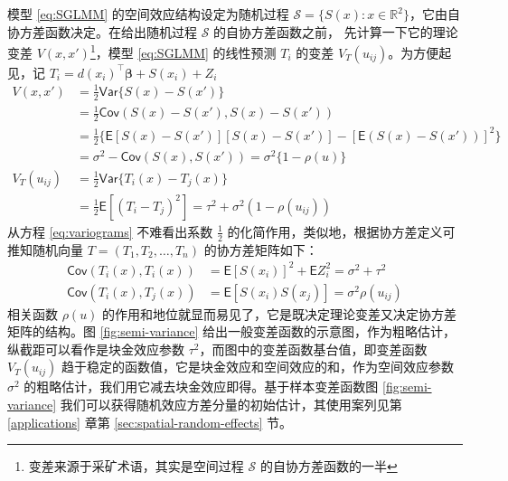 \documentclass[12pt,a4paper,UTF8,twoside]{book}
\theoremstyle{definition}
\theoremstyle{definition}
\theoremstyle{definition}
\theoremstyle{remark}
\begin{document}
模型 \eqref{eq:SGLMM} 的空间效应结构设定为随机过程
\(\mathcal{S} = \{S(x): x \in \mathbb{R}^2\}\)，它由自协方差函数决定。在给出随机过程
\(\mathcal{S}\) 的自协方差函数之前， 先计算一下它的理论变差
\(V(x,x')\)\footnote{变差来源于采矿术语，其实是空间过程 \(\mathcal{S}\)
  的自协方差函数的一半}，模型 \eqref{eq:SGLMM} 的线性预测 \(T_{i}\) 的变差
\(V_{T}(u_{ij})\)。为方便起见，记
\(T_{i} = d(x_i)^{\top}\boldsymbol{\beta} + S(x_i) + Z_i\)
\begin{equation}
\begin{aligned}
V(x,x') 
      &= \frac{1}{2}\mathsf{Var}\{S(x)-S(x')\}\\
      &= \frac{1}{2}\mathsf{Cov}(S(x)-S(x'),S(x)-S(x'))\\
      &= \frac{1}{2}\{\mathsf{E}[S(x)-S(x')][S(x)-S(x')]-[\mathsf{E}(S(x)-S(x'))]^2\}\\
      &= \sigma^2-\mathsf{Cov}(S(x),S(x'))=\sigma^2\{1-\rho(u)\}\\
V_{T}(u_{ij})
      &= \frac{1}{2}\mathsf{Var}\{T_{i}(x)-T_{j}(x)\} \\
      &= \frac{1}{2}\mathsf{E}[(T_{i}-T_{j})^2]=\tau^2+\sigma^2(1-\rho(u_{ij})) 
\end{aligned} \label{eq:variograms}
\end{equation} \noindent 从方程 \eqref{eq:variograms} 不难看出系数
\(\frac{1}{2}\) 的化简作用，类似地，根据协方差定义可推知随机向量
\(T = (T_1,T_2,\ldots,T_n)\) 的协方差矩阵如下： \begin{equation}
\begin{aligned}
\mathsf{Cov}(T_{i}(x),T_{i}(x)) &= \mathsf{E}[S(x_i)]^2 + \mathsf{E}Z_{i}^{2}= \sigma^2+\tau^2 \\
\mathsf{Cov}(T_{i}(x),T_{j}(x)) &= \mathsf{E}[S(x_i)S(x_j)]  = \sigma^2\rho(u_{ij})
\end{aligned}
\end{equation} \noindent 相关函数 \(\rho(u)\)
的作用和地位就显而易见了，它是既决定理论变差又决定协方差矩阵的结构。图
\ref{fig:semi-variance}
给出一般变差函数的示意图，作为粗略估计，纵截距可以看作是块金效应参数
\(\tau^2\)，而图中的变差函数基台值，即变差函数 \(V_{T}(u_{ij})\)
趋于稳定的函数值，它是块金效应和空间效应的和，作为空间效应参数
\(\sigma^2\) 的粗略估计，我们用它减去块金效应即得。基于样本变差函数图
\ref{fig:semi-variance}
我们可以获得随机效应方差分量的初始估计，其使用案列见第
\ref{applications} 章第 \ref{sec:spatial-random-effects} 节。
\end{document}

